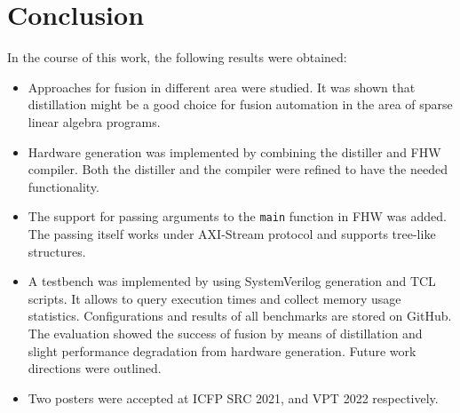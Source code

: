 \section{Conclusion}

In the course of this work, the following results were obtained:

\begin{itemize}
    \item Approaches for fusion in different area were studied. It was shown that distillation might be a good choice for fusion automation in the area of sparse linear algebra programs.
    \item Hardware generation was implemented by combining the distiller and FHW compiler. Both the distiller and the compiler were refined to have the needed functionality.
    \item The support for passing arguments to the \texttt{main} function in FHW was added. The passing itself works under AXI-Stream protocol and supports tree-like structures.
    \item A testbench was implemented by using SystemVerilog generation and TCL scripts. It allows to query execution times and collect memory usage statistics. Configurations and results of all benchmarks are stored on GitHub. The evaluation showed the success of fusion by means of distillation and slight performance degradation from hardware generation. Future work directions were outlined.
    \item Two posters were accepted at ICFP SRC 2021, and VPT 2022 respectively.
\end{itemize}
